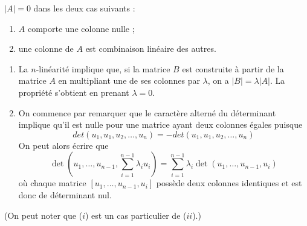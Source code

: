 \begin{lemma} \label{lem:determinantNul}
  $|A| = 0$ dans les deux cas suivants :
  \begin{enumerate}[($i$)] 
  \item $A$ comporte une colonne nulle ;
  \item une colonne de $A$ est combinaison linéaire des autres.
  \end{enumerate}
\end{lemma}

\proof 
\begin{enumerate}[($i$)]
\item La $n$-linéarité implique que, si la matrice $B$ est construite à partir de la matrice $A$ en multipliant une de ses colonnes par $\lambda$, on a $|B| = \lambda |A|$. La propriété s'obtient en prenant $\lambda = 0$.
\item On commence par remarquer que le caractère alterné du déterminant implique qu'il est nulle pour une matrice ayant deux colonnes égales puisque
$$
det(u_1, u_1, u_2,\dots, u_n) = -det(u_1, u_1, u_2,\dots, u_n)
$$
On peut alors écrire que 
$$
\det\left(u_1, \dots, u_{n-1}, \sum_{i=1}^{n-1} \lambda_i u_i\right)
= \sum_{i=1}^{n-1} \lambda_i \det\left(u_1, \dots, u_{n-1}, u_i\right)
$$
où chaque matrice $\left[u_1, \dots, u_{n-1}, u_i\right]$ possède deux colonnes identiques et est donc de déterminant nul.
\end{enumerate}
(On peut noter que ($i$) est un cas particulier de ($ii$).)
\eproof

